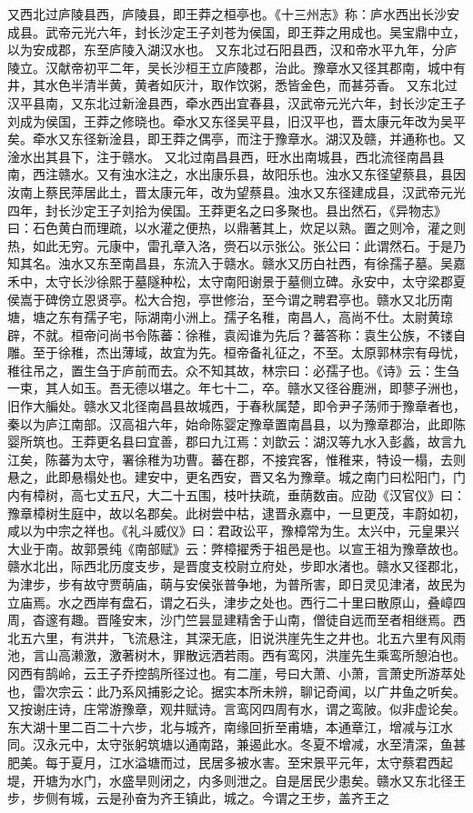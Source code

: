 \documentclass[12pt,UTF8]{ctexbook}
\begin{document}
又西北过庐陵县西，庐陵县，即王莽之桓亭也。《十三州志》称：庐水西出长沙安成县。武帝元光六年，封长沙定王子刘苍为侯国，即王莽之用成也。吴宝鼎中立，以为安成郡，东至庐陵入湖汉水也。
又东北过石阳县西，汉和帝水平九年，分庐陵立。汉献帝初平二年，吴长沙桓王立庐陵郡，治此。豫章水又径其郡南，城中有井，其水色半清半黄，黄者如灰汁，取作饮粥，悉皆金色，而甚芬香。
又东北过汉平县南，又东北过新淦县西，牵水西出宜春县，汉武帝元光六年，封长沙定王子刘成为侯国，王莽之修晓也。牵水又东径吴平县，旧汉平也，晋太康元年改为吴平矣。牵水又东径新淦县，即王莽之偶亭，而注于豫章水。湖汉及赣，并通称也。又淦水出其县下，注于赣水。
又北过南昌县西，旺水出南城县，西北流径南昌县南，西注赣水。又有浊水注之，水出康乐县，故阳乐也。浊水又东径望蔡县，县因汝南上蔡民萍居此土，晋太康元年，改为望蔡县。浊水又东径建成县，汉武帝元光四年，封长沙定王子刘拾为侯国。王莽更名之曰多聚也。县出然石，《异物志》曰：石色黄白而理疏，以水灌之便热，以鼎著其上，炊足以熟。置之则冷，灌之则热，如此无穷。元康中，雷孔章入洛，赍石以示张公。张公曰：此谓然石。于是乃知其名。浊水又东至南昌县，东流入于赣水。赣水又历白社西，有徐孺子墓。吴嘉禾中，太守长沙徐熙于墓隧种松，太守南阳谢景于墓侧立碑。永安中，太守梁郡夏侯嵩于碑傍立恩贤亭。松大合抱，亭世修治，至今谓之聘君亭也。赣水又北历南塘，塘之东有孺子宅，际湖南小洲上。孺子名稚，南昌人，高尚不仕。太尉黄琼辟，不就。桓帝问尚书令陈蕃：徐稚，袁闳谁为先后？蕃答称：袁生公族，不镂自雕。至于徐稚，杰出薄域，故宜为先。桓帝备礼征之，不至。太原郭林宗有母忧，稚往吊之，置生刍于庐前而去。众不知其故，林宗曰：必孺子也。《诗》云：生刍一束，其人如玉。吾无德以堪之。年七十二，卒。赣水又径谷鹿洲，即蓼子洲也，旧作大艑处。赣水又北径南昌县故城西，于春秋属楚，即令尹子荡师于豫章者也，秦以为庐江南部。汉高祖六年，始命陈婴定豫章置南昌县，以为豫章郡治，此即陈婴所筑也。王莽更名县曰宜善，郡曰九江焉：刘歆云：湖汉等九水入彭蠡，故言九江矣，陈蕃为太守，署徐稚为功曹。蕃在郡，不接宾客，惟稚来，特设一榻，去则悬之，此即悬榻处也。建安中，更名西安，晋又名为豫章。城之南门曰松阳门，门内有樟树，高七丈五尺，大二十五围，枝叶扶疏，垂荫数亩。应劭《汉官仪》曰：豫章樟树生庭中，故以名郡矣。此树尝中枯，逮晋永嘉中，一旦更茂，丰蔚如初，咸以为中宗之祥也。《礼斗威仪》曰：君政讼平，豫樟常为生。太兴中，元皇果兴大业于南。故郭景纯《南部赋》云：弊樟擢秀于祖邑是也。以宣王祖为豫章故也。赣水北出，际西北历度支步，是晋度支校尉立府处，步即水渚也。赣水又径郡北，为津步，步有故守贾萌庙，萌与安侯张普争地，为普所害，即日灵见津渚，故民为立庙焉。水之西岸有盘石，谓之石头，津步之处也。西行二十里曰散原山，叠嶂四周，杳邃有趣。晋隆安末，沙门竺昙显建精舍于山南，僧徒自远而至者相继焉。西北五六里，有洪井，飞流悬注，其深无底，旧说洪崖先生之井也。北五六里有风雨池，言山高濑激，激著树木，罪散远洒若雨。西有鸾冈，洪崖先生乘鸾所憩泊也。冈西有鹄岭，云王子乔控鹄所径过也。有二崖，号曰大萧、小萧，言萧史所游萃处也，雷次宗云：此乃系风捕影之论。据实本所未辨，聊记奇闻，以广井鱼之听矣。又按谢庄诗，庄常游豫章，观井赋诗。言鸾冈四周有水，谓之鸾陂。似非虚论矣。东大湖十里二百二十六步，北与城齐，南缘回折至甫塘，本通章江，增减与江水同。汉永元中，太守张躬筑塘以通南路，兼遏此水。冬夏不增减，水至清深，鱼甚肥美。每于夏月，江水溢塘而过，民居多被水害。至宋景平元年，太守蔡君西起堤，开塘为水门，水盛旱则闭之，内多则泄之。自是居民少患矣。赣水又东北径王步，步侧有城，云是孙奋为齐王镇此，城之。今谓之王步，盖齐王之
\end{document}
